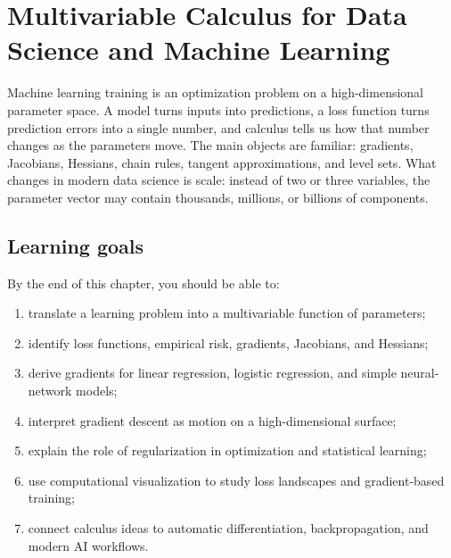 \documentclass[11pt,oneside]{book}
\begin{document}
\setcounter{chapter}{24}
\chapter{Multivariable Calculus for Data Science and Machine Learning}

\begin{mainideabox}
Machine learning training is an optimization problem on a high-dimensional parameter space. A model turns inputs into predictions, a loss function turns prediction errors into a single number, and calculus tells us how that number changes as the parameters move. The main objects are familiar: gradients, Jacobians, Hessians, chain rules, tangent approximations, and level sets. What changes in modern data science is scale: instead of two or three variables, the parameter vector may contain thousands, millions, or billions of components.
\end{mainideabox}

\section*{Learning goals}
By the end of this chapter, you should be able to:
\begin{enumerate}
  \item translate a learning problem into a multivariable function of parameters;
  \item identify loss functions, empirical risk, gradients, Jacobians, and Hessians;
  \item derive gradients for linear regression, logistic regression, and simple neural-network models;
  \item interpret gradient descent as motion on a high-dimensional surface;
  \item explain the role of regularization in optimization and statistical learning;
  \item use computational visualization to study loss landscapes and gradient-based training;
  \item connect calculus ideas to automatic differentiation, backpropagation, and modern AI workflows.
\end{enumerate}
\end{document}
